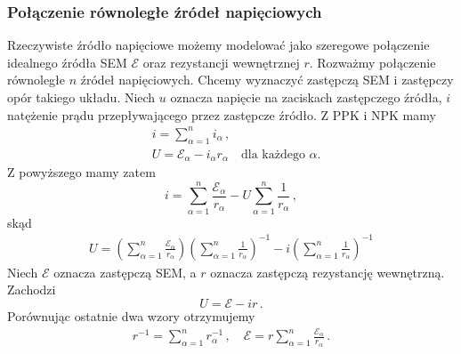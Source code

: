 \documentclass[../main.tex]{subfiles}
\begin{document}
\subsubsection*{Połączenie równoległe źródeł napięciowych}
Rzeczywiste źródło napięciowe możemy modelować jako szeregowe połączenie idealnego źródła SEM
\(\mathcal{E}\) oraz rezystancji wewnętrznej \(r\). Rozważmy połączenie równoległe \(n\) źródeł
napięciowych. Chcemy wyznaczyć zastępczą SEM i zastępczy opór takiego układu. Niech \(u\) oznacza
napięcie na zaciskach zastępczego źródła, \(i\) natężenie prądu przepływającego przez zastępcze
źródło. Z PPK i NPK mamy
\begin{equation*}
    \begin{split}
        & i=\sum_{\alpha=1}^ni_\alpha\,,\\
        &U=\mathcal{E}_\alpha-i_\alpha r_\alpha\quad\text{dla każdego \(\alpha\).}
    \end{split}
\end{equation*}
Z powyższego mamy zatem
\begin{equation*}
    i=\sum_{\alpha=1}^n\frac{\mathcal{E}_\alpha}{r_\alpha}-U\sum_{\alpha=1}^n\frac{1}{r_\alpha}\,,
\end{equation*}
skąd
\begin{equation*}
\begin{split}
    U=\left(\sum_{\alpha=1}^n\frac{\mathcal{E}_\alpha}{r_\alpha}\right)\left(\sum_{\alpha=1}^n\frac{1}{r_\alpha}\right)^{-1}-i\left(\sum_{\alpha=1}^n\frac{1}{r_\alpha}\right)^{-1}
\end{split}
\end{equation*}
Niech \(\mathcal{E}\) oznacza zastępczą SEM, a \(r\) oznacza zastępczą rezystancję wewnętrzną.
Zachodzi
\begin{equation*}
    U=\mathcal{E}-ir\,.
\end{equation*}
Porównując ostatnie dwa wzory otrzymujemy
\begin{equation*}
    \begin{split}
        r^{-1}=\sum_{\alpha=1}^nr_\alpha^{-1}\,,\quad\mathcal{E}=r\sum_{\alpha=1}^n\frac{\mathcal{E}_\alpha}{r_\alpha}\,.
    \end{split}
\end{equation*}
\end{document}
